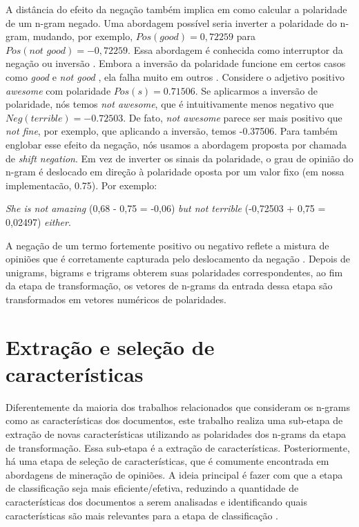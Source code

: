 \documentclass[template.tex]{subfiles}
\begin{document}
A distância do efeito da negação também implica em como calcular a polaridade de um n-gram negado.  Uma abordagem possível seria inverter a polaridade do n-gram, mudando, por exemplo, $Pos(\textit{good}) = 0,72259$ para $Pos(\textit{not good}) = - 0,72259$. Essa abordagem é conhecida como interruptor da negação ou inversão \cite{sauri2008factuality}. Embora a inversão da polaridade funcione em certos casos como \textit{good} e \textit{not good} \cite{choi2008learning}, ela falha muito em outros \cite{liu2009review}. Considere o adjetivo positivo \textit{awesome} com polaridade $Pos(s) = 0.71506 $. Se aplicarmos a inversão de polaridade, nós temos \textit{not awesome}, que é intuitivamente menos negativo que $Neg(\textit{terrible}) = -0.72503$. De fato, \textit{not awesome} parece ser mais positivo que \textit{not fine}, por exemplo, que aplicando a inversão, temos -0.37506. Para também englobar esse efeito da negação, nós usamos a abordagem proposta por  chamada de \textit{shift negation}. Em vez de inverter os sinais da polaridade, o grau de opinião do n-gram é deslocado em direção à polaridade oposta por um valor fixo (em nossa implementacão, 0.75). Por exemplo:

\begin{example}
\textit{She is not amazing} (0,68 - 0,75 = -0,06) \textit{but not terrible} (-0,72503 + 0,75 = 0,02497) \textit{either}.
\label{ex:shift_1}
\end{example}

A negação de um termo fortemente positivo ou negativo reflete a mistura de opiniões que é corretamente capturada pelo deslocamento da negação \cite{taboada2011lexicon}. Depois de unigrams, bigrams e trigrams obterem suas polaridades correspondentes, ao fim da etapa de transformação, os vetores de n-grams da entrada dessa etapa são transformados em vetores numéricos de polaridades.  

\section{Extração e seleção de características}

Diferentemente da maioria dos trabalhos relacionados que consideram os n-grams como as características dos documentos, este trabalho realiza uma sub-etapa de extração de novas características utilizando as polaridades dos n-grams da etapa de transformação. Essa sub-etapa é a extração de características. Posteriormente, há uma etapa de seleção de características, que é comumente encontrada em abordagens de mineração de opiniões. A ideia principal é fazer com que a etapa de classificação seja mais eficiente/efetiva, reduzindo a quantidade de características dos documentos a serem analisadas e identificando quais características são mais relevantes para a etapa de classificação \cite{moraes2012document}. 
\end{document}
